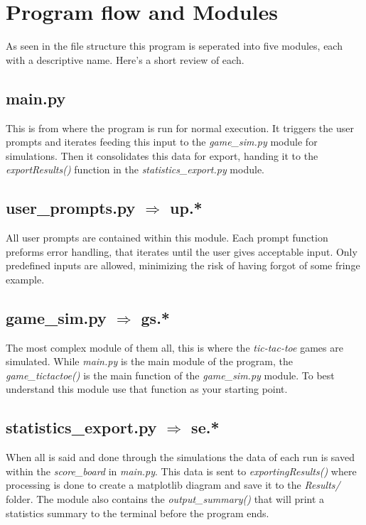 \documentclass[12pt,a4paper]{article}
\begin{document}
\section{Program flow and Modules}
As seen in the file structure this program is seperated into five modules, each with a descriptive name. Here's a short review of each.

\subsection*{main.py}
This is from where the program is run for normal execution. It triggers the user prompts and iterates feeding this input to the \emph{game\_sim.py} module for simulations. Then it consolidates this data for export, handing it to the \emph{exportResults()} function in the \emph{statistics\_export.py} module.

\subsection*{user\_prompts.py $\Rightarrow$ up.*}
All user prompts are contained within this module. Each prompt function preforms error handling, that iterates until the user gives acceptable input. Only predefined inputs are allowed, minimizing the risk of having forgot of some fringe example.

\subsection*{game\_sim.py $\Rightarrow$ gs.*}
The most complex module of them all, this is where the \emph{tic-tac-toe} games are simulated. While \emph{main.py} is the main module of the program, the \emph{game\_tictactoe()} is the main function of the \emph{game\_sim.py} module. To best understand this module use that function as your starting point.

\subsection*{statistics\_export.py $\Rightarrow$ se.*}
When all is said and done through the simulations the data of each run is saved within the \emph{score\_board} in \emph{main.py}. This data is sent to \emph{exportingResults()} where processing is done to create a matplotlib diagram and save it to the \emph{Results/} folder. The module also contains the \emph{output\_summary()} that will print a statistics summary to the terminal before the program ends.
\end{document}
